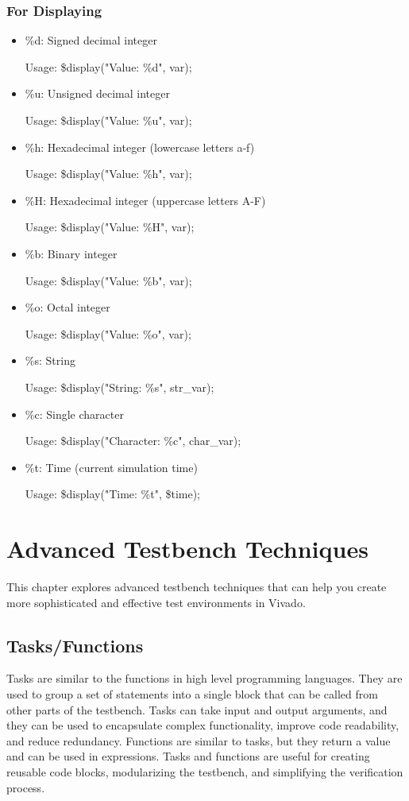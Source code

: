 \documentclass{report}
\begin{document}
\subsection{For Displaying}
\begin{itemize}
\item \%d: Signed decimal integer

    Usage: \$display("Value: \%d", var);

\item \%u: Unsigned decimal integer

    Usage: \$display("Value: \%u", var);

\item \%h: Hexadecimal integer (lowercase letters a-f)

    Usage: \$display("Value: \%h", var);

\item \%H: Hexadecimal integer (uppercase letters A-F)

    Usage: \$display("Value: \%H", var);

\item \%b: Binary integer

    Usage: \$display("Value: \%b", var);

\item \%o: Octal integer

    Usage: \$display("Value: \%o", var);

\item \%s: String

    Usage: \$display("String: \%s", str\_var);

\item \%c: Single character

    Usage: \$display("Character: \%c", char\_var);

\item \%t: Time (current simulation time)

    Usage: \$display("Time: \%t", \$time);
\end{itemize}

\chapter{Advanced Testbench Techniques}
This chapter explores advanced testbench techniques that can help you create more sophisticated and effective test environments in Vivado.
\section{Tasks/Functions}
Tasks are similar to the functions in high level programming languages. They are used to group a set of statements into a single block that can be called from other parts of the testbench. Tasks can take input and output arguments, and they can be used to encapsulate complex functionality, improve code readability, and reduce redundancy. Functions are similar to tasks, but they return a value and can be used in expressions. Tasks and functions are useful for creating reusable code blocks, modularizing the testbench, and simplifying the verification process.
\end{document}
